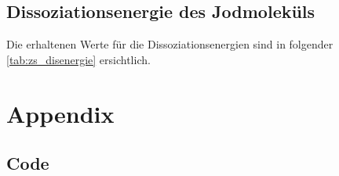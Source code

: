 \documentclass[12pt,english,ngerman]{scrartcl}
\begin{document}

\subsection{Dissoziationsenergie des Jodmoleküls}

Die erhaltenen Werte für die Dissoziationsenergien sind in folgender
\autoref{tab:zs_disenergie} ersichtlich.

\newpage

\section{Appendix}\label{sec:Appendix}
\subsection{Code}\label{sec:code}



\listoffigures
\listoftables
\end{document}
